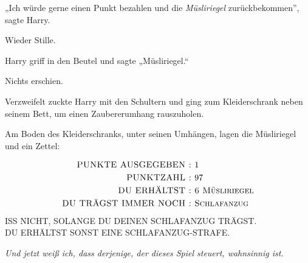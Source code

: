 „Ich würde gerne einen Punkt bezahlen und die \emph{Müsliriegel} zurückbekommen”, sagte Harry.

Wieder Stille.

Harry griff in den Beutel und sagte „Müsliriegel.“

Nichts erschien.

Verzweifelt zuckte Harry mit den Schultern und ging zum Kleiderschrank neben seinem Bett, um einen Zaubererumhang rauszuholen.

Am Boden des Kleiderschranks, unter seinen Umhängen, lagen die Müsliriegel und ein Zettel:
\begin{writtenNote}\centering
\begin{align*}
\hbox{\scshape \uppercase{Punkte ausgegeben}~: }&\hbox{1}\\
\hbox{\scshape \uppercase{Punktzahl}~: }&\hbox{97}\\
\hbox{\scshape \uppercase{Du erhältst}~: }&\hbox{\scshape 6 Müsliriegel}\\
\hbox{\scshape \uppercase{Du trägst immer noch}~: }&\hbox{\scshape Schlafanzug}\\
\end{align*}
\uppercase{Iss nicht, solange du deinen Schlafanzug trägst.}\\
\uppercase{Du erhältst sonst eine Schlafanzug-Strafe.}
\end{writtenNote}

\emph{Und jetzt weiß ich, dass derjenige, der dieses Spiel steuert, wahnsinnig ist.}

